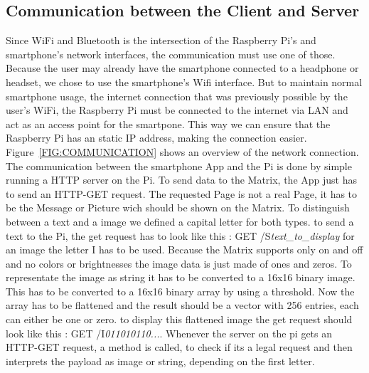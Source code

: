 \documentclass[conference]{IEEEtran}
\begin{document}
\subsection{Communication between the Client and Server}
Since WiFi and Bluetooth is the intersection of the Raspberry Pi's and smartphone's network interfaces, the communication must use one of those. Because the user may already have the smartphone connected to a headphone or headset, we chose to use the smartphone's Wifi interface. But to maintain normal smartphone usage, the internet connection that was previously possible by the user's WiFi, the Raspberry Pi must be connected to the internet via LAN and act as an access point for the smartpone. This way we can ensure that the Raspberry Pi has an static IP address, making the connection easier. Figure~\ref{FIG:COMMUNICATION} shows an overview of the network connection. The communication between the smartphone App and the Pi is done by simple running a HTTP server on the Pi. To send data to the Matrix, the App just has to send an HTTP-GET request. The requested Page is not a real Page, it has to be the Message or Picture wich should be shown on the Matrix. To distinguish between a text and a image we defined a capital letter for both types. to send a text to the Pi, the get request has to look like this : GET /S\textit{text\_to\_display} for an image the letter I has to be used. Because the Matrix supports only on and off and no colors or brightnesses the image data is just made of ones and zeros. To representate the image as string it has to be converted to a 16x16 binary image. This has to be converted to a 16x16 binary array by using a threshold. Now the array has to be flattened and the result should be a vector with 256 entries, each can either be one or zero. to display this flattened image the get request should look like this : GET /I\textit{011010110...}. Whenever the server on the pi gets an HTTP-GET request, a method is called, to check if its a legal request and then interprets the payload as image or string, depending on the first letter.
\end{document}
